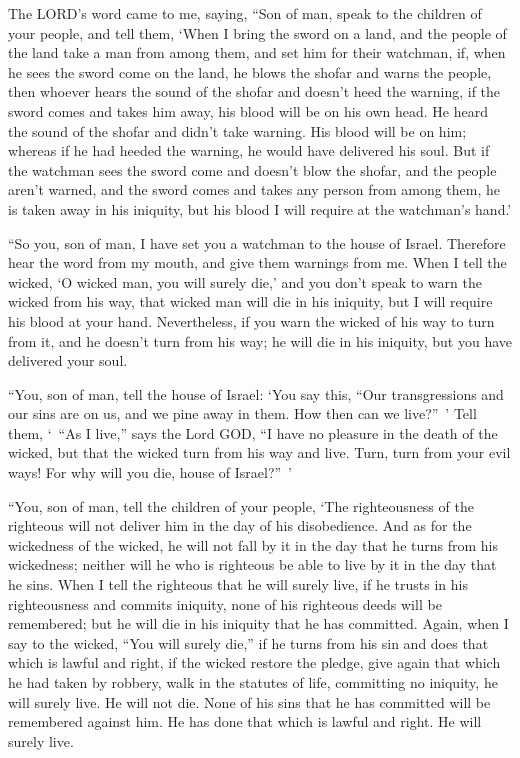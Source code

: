 \mychapter{} \myverse*{}The LORD’s word came to me, saying,
\myverse{}“Son of man, speak to the children of your people, and tell them, ‘When I bring
the sword on a land, and the people of the land take a man from among them, and set him for their watchman,
\myverse{}if, when he sees the sword come on the land, he blows the shofar and warns
the people,
\myverse{}then whoever hears the sound of the shofar and doesn’t heed the warning, if
the sword comes and takes him away, his blood will be on his own head.
\myverse{}He heard the sound of the shofar and didn’t take warning. His blood will be
on him; whereas if he had heeded the warning, he would have delivered his soul.
\myverse{}But if the watchman sees the sword come and doesn’t blow the shofar, and the
people aren’t warned, and the sword comes and takes any person from among them, he is taken away in his
iniquity, but his blood I will require at the watchman’s hand.’

\myverse{}“So you, son of man, I have set you a watchman to the house of
Israel. Therefore hear the word from my mouth, and give them warnings from me.
\myverse{}When I tell the wicked, ‘O wicked man, you will surely die,’ and you don’t
speak to warn the wicked from his way, that wicked man will die in his iniquity, but I will require his
blood at your hand.
\myverse{}Nevertheless, if you warn the wicked of his way to turn from it, and he doesn’t
turn from his way; he will die in his iniquity, but you have delivered your soul.

\myverse{}“You, son of man, tell the house of Israel: ‘You say this, “Our
transgressions and our sins are on us, and we pine away in them. How then can we live?” ’
\myverse{}Tell them, ‘ “As I live,” says the Lord GOD, “I have no pleasure in the death
of the wicked, but that the wicked turn from his way and live. Turn, turn from your evil ways! For why
will you die, house of Israel?” ’

\myverse{}“You, son of man, tell the children of your people, ‘The righteousness
of the righteous will not deliver him in the day of his disobedience. And as for the wickedness of the
wicked, he will not fall by it in the day that he turns from his wickedness; neither will he who is righteous
be able to live by it in the day that he sins.
\myverse{}When I tell the righteous that he will surely live, if he trusts in his righteousness
and commits iniquity, none of his righteous deeds will be remembered; but he will die in his iniquity
that he has committed.
\myverse{}Again, when I say to the wicked, “You will surely die,” if he turns from
his sin and does that which is lawful and right,
\myverse{}if the wicked restore the pledge, give again that which he had taken by robbery,
walk in the statutes of life, committing no iniquity, he will surely live. He will not die.
\myverse{}None of his sins that he has committed will be remembered against him. He
has done that which is lawful and right. He will surely live.

